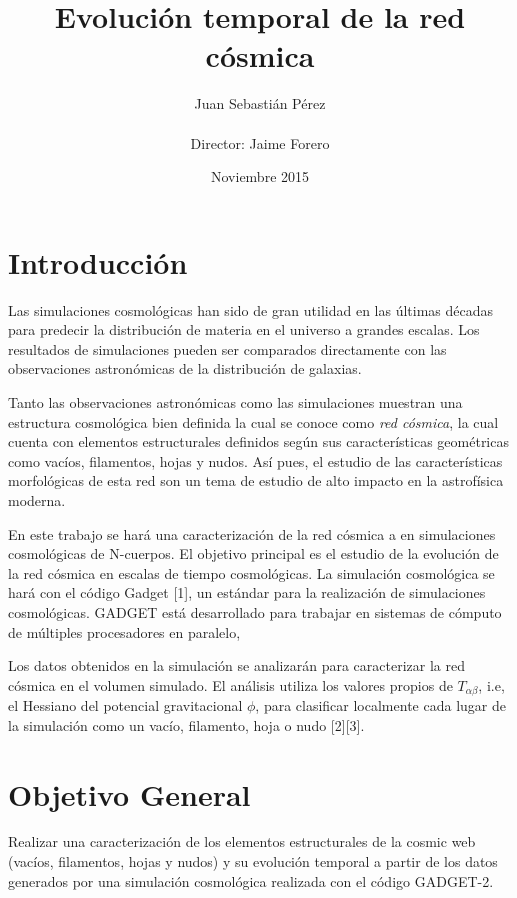 \documentclass{article}
\title{Evoluci\'on temporal de la red c\'osmica}
\author{Juan Sebastián Pérez\\ \\Director: Jaime Forero}
\date{Noviembre 2015}
\begin{document}
\maketitle

\section{Introducción}

Las simulaciones cosmológicas han sido de gran utilidad en las últimas
décadas para predecir la distribuci\'on de materia en el universo a
grandes escalas.  Los resultados de simulaciones pueden ser
comparados directamente con las observaciones astron\'omicas de la
distribuci\'on de galaxias.

Tanto las observaciones astronómicas como las simulaciones muestran
una estructura cosmológica bien definida la cual se conoce como
\emph{red c\'osmica}, la cual cuenta con elementos estructurales
definidos según sus características geométricas como vacíos,
filamentos, hojas y nudos.  Así pues, el estudio de las
características morfológicas de esta red son un tema de estudio de
alto impacto en la astrofísica moderna.

En este trabajo se har\'a una caracterización de la red c\'osmica a en
simulaciones cosmológicas de N-cuerpos.  El objetivo principal es el
estudio de la evoluci\'on de la red c\'osmica en escalas de tiempo
cosmol\'ogicas.  La simulación cosmol\'ogica se hará con el c\'odigo
Gadget [1], un estándar para la realización de simulaciones
cosmológicas. GADGET est\'a desarrollado para trabajar en sistemas de
cómputo de múltiples procesadores en paralelo,


Los datos obtenidos en la simulación se analizar\'an para caracterizar
la red c\'osmica en el volumen simulado.  El an\'alisis utiliza los
valores propios de $T_{\alpha \beta}$, i.e, el Hessiano del potencial
gravitacional $\phi$, para clasificar localmente cada lugar de la
simulaci\'on como un vac\'io, filamento, hoja o nudo [2][3].


\section{Objetivo General}

Realizar una caracterización de los elementos estructurales de la
cosmic web (vacíos, filamentos, hojas y nudos) y su evolución temporal
a partir de los datos generados por una simulación cosmológica
realizada con el código GADGET-2.  
\end{document}
